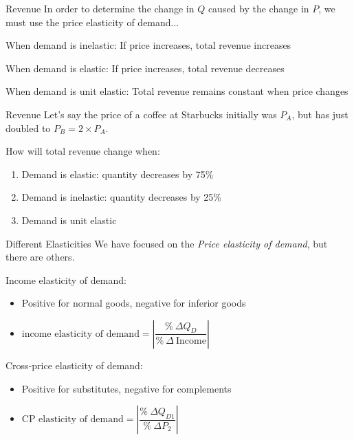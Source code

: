 \documentclass[compress]{beamer}
\begin{document}
\begin{frame}{Revenue}
In order to determine the change in $Q$ caused by the change in $P$, we must use the price elasticity of demand...
\begin{block}{When demand is inelastic:}
    If price increases, total revenue increases
\end{block}    
\begin{block}{When demand is elastic:}
    If price increases, total revenue decreases
\end{block}
\begin{block}{When demand is unit elastic:}
    Total revenue remains constant when price changes
\end{block}
\end{frame}

\begin{frame}{Revenue}
    Let's say the price of a coffee at Starbucks initially was $P_A$, but has just doubled to $P_B = 2\times P_A$.

    \begin{block}{How will total revenue change when:}
    \begin{enumerate}
        \item Demand is elastic: quantity decreases by 75\%
        \item Demand is inelastic: quantity decreases by 25\%
        \item Demand is unit elastic
    \end{enumerate}
        
    \end{block}
\end{frame}

\begin{frame}{Different Elasticities}
    We have focused on the \textit{Price elasticity of demand}, but there are others.

\medskip
Income elasticity of demand:
    \begin{itemize}
        \item Positive for normal goods, negative for inferior goods
        \item $\text{income elasticity of demand} = |\dfrac{\%~\Delta Q_D}{\%~\Delta~\text{Income}}|$
    \end{itemize}

    \medskip
    \medskip

    Cross-price elasticity of demand:
    \begin{itemize}
        \item Positive for substitutes, negative for complements
        \item $\text{CP elasticity of demand} = |\dfrac{\%~\Delta Q_{D1}}{\%~\Delta P_2}|$
    \end{itemize}
    
\end{frame}
\end{document}
